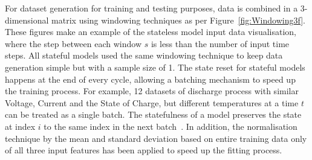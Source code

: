 %
For dataset generation for training and testing purposes, data is combined in a 3-dimensional matrix using windowing techniques as per \mbox{Figure~\ref{fig:Windowing3f}}.
These figures make an example of the stateless model input data visualisation, where the step between each window $s$ is less than the number of input time steps.
All stateful models used the same windowing technique to keep data generation simple but with a sample size of 1.
The state reset for stateful models happens at the end of every cycle, allowing a batching mechanism to speed up the training process.
For example, 12 datasets of discharge process with similar Voltage, Current and the State of Charge, but different temperatures at a time $t$ can be treated as a single batch.
The statefulness of a model preserves the state at index $i$ to the same index in the next batch~\cite{zhu_statefulnes_tfdocs_2020}.
In addition, the normalisation technique by the mean and standard deviation based on entire training data only of all three input features has been applied to speed up the fitting process.

